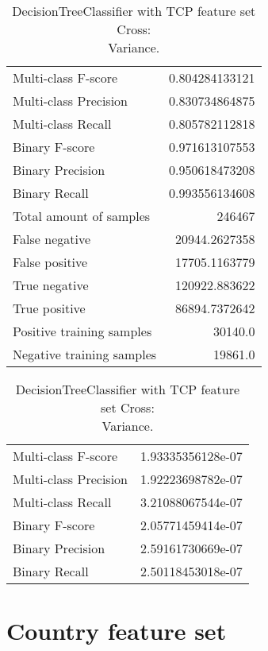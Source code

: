 \begin{table}[H]
\begin{minipage}{0.5\textwidth}
\caption{DecisionTreeClassifier with TCP feature set Cross: \\Average.}
\centering
\begin{tabular}{l r}
\toprule
Multi-class F-score & 0.804284133121 \\
Multi-class Precision & 0.830734864875 \\
Multi-class Recall & 0.805782112818 \\
\midrule
Binary F-score & 0.971613107553 \\
Binary Precision & 0.950618473208 \\
Binary Recall & 0.993556134608 \\
\midrule
Total amount of samples & 246467 \\
False negative & 20944.2627358 \\
False positive & 17705.1163779 \\
True negative & 120922.883622 \\
True positive & 86894.7372642 \\
\midrule
Positive training samples & 30140.0 \\
Negative training samples & 19861.0 \\
\bottomrule
\end{tabular}
\end{minipage}
\hfillx
\begin{minipage}{0.5\textwidth}
\caption{DecisionTreeClassifier with TCP feature set Cross: \\Variance.}
\centering
\begin{tabular}{l r}
\toprule
Multi-class F-score & 1.93335356128e-07 \\
Multi-class Precision & 1.92223698782e-07 \\
Multi-class Recall & 3.21088067544e-07 \\
\midrule
Binary F-score & 2.05771459414e-07 \\
Binary Precision & 2.59161730669e-07 \\
Binary Recall & 2.50118453018e-07 \\
\bottomrule
\end{tabular}
\end{minipage}
\end{table}


\newpage
\section{Country feature set}
